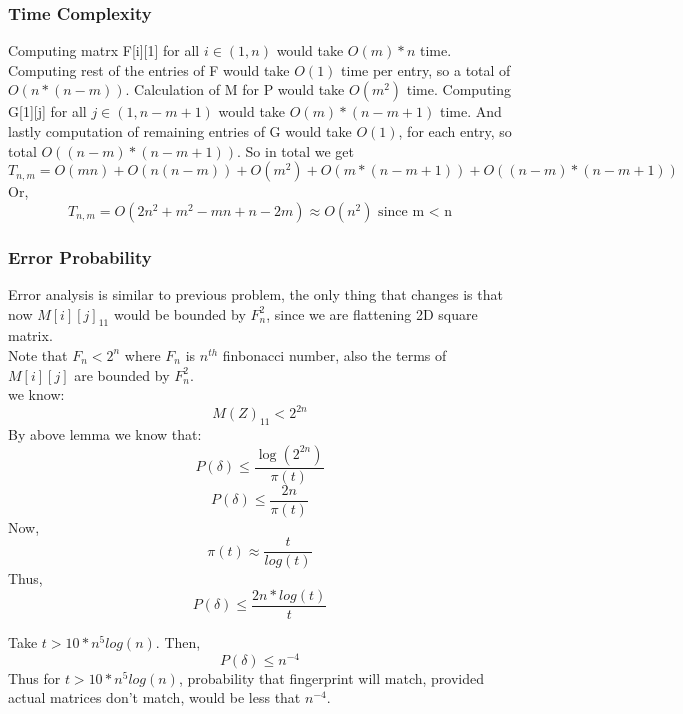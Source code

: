 \documentclass[a4paper]{article}
\begin{document}
\subsubsection*{Time Complexity}
Computing matrx F[i][1] for all $i \in (1, n)$ would take $O(m) * n$ time. Computing rest of the entries of F would take $O(1)$ time per entry, so a total of $O(n*(n-m))$. Calculation of M for P would take $O(m^2)$ time. Computing G[1][j] for all $j\in (1,n-m+1)$ would take $O(m) * (n-m+1)$ time. And lastly computation of remaining entries of G would take $O(1)$, for each entry, so total $O((n-m)*(n -m + 1))$. So in total we get 
$$T_{n,m} = O(mn) + O(n(n - m)) + O(m^2) + O(m*(n - m + 1)) + O((n-m)*(n-m+1))$$
Or, $$T_{n,m} = O(2n^2 + m^2 - mn + n - 2m) \approx O(n^2) \text{ since m < n}$$


\subsubsection*{Error Probability}
Error analysis is similar to previous problem, the only thing that changes is that now $M[i][j]_{11}$ would be bounded by $F_{n}^2$, since we are flattening 2D square matrix.\\
Note that $F_n < 2^n$ where $F_n$ is $n^{th}$ finbonacci number, also the terms of $M[i][j]$ are bounded by $F_n^2$.\\
we know: $$M(Z)_{11} < 2^{2n}$$
By above lemma we know that: $$P(\delta) \leq \dfrac{\log (2^{2n})}{\pi(t)}$$
$$P(\delta) \leq \frac{2n}{\pi(t)}$$
Now,
$$\pi(t) \approx \frac{t}{log(t)}$$
Thus, $$P(\delta) \leq \frac{2n*log(t)}{t}$$

Take $t > 10*n^5log(n)$. Then, $$P(\delta) \leq n^{-4}$$
Thus for $t > 10*n^5log(n)$, probability that fingerprint will match, provided actual matrices don't match, would be less that $n^{-4}$.
\end{document}
